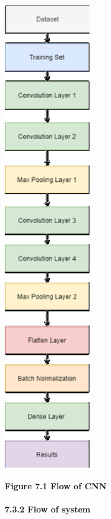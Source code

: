 \documentclass{article} %
\begin{document}
\noindent \includegraphics*[width=1.50in, height=8.16in, keepaspectratio=false]{image34}

\noindent \textbf{Figure 7.1 Flow of CNN}

\noindent 
\paragraph{7.3.2 Flow of system}
\end{document}
